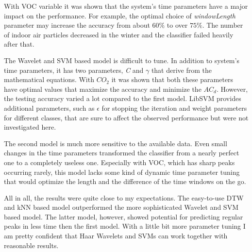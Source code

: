 With VOC variable it was shown that the system's time parameters have a major impact on the performance. For example, the optimal choice of \emph{windowLength} parameter may increase the accuracy from about $60 \%$ to over $75 \%$. The number of indoor air particles decreased in the winter and the classifier failed heavily after that.


The Wavelet and SVM based model is difficult to tune. In addition to system's time parameters, it has two parameters, \emph{C} and $\gamma$ that derive from the mathematical equations. With $CO_2$ it was shown that both these parameters have optimal values that maximize the accuracy and minimize the $AC_d$. However, the testing accuracy varied a lot compared to the first model. LibSVM provides additional parameters, such as $\epsilon$ for stopping the iteration and weight parameters for different classes, that are sure to affect the observed performance but were not investigated here.

The second model is much more sensitive to the available data. Even small changes in the time parameters transformed the classifier from a nearly perfect one to a completely useless one. Especially with VOC, which has sharp peaks occurring rarely, this model lacks some kind of dynamic time parameter tuning that would optimize the length and the difference of the time windows on the go.

All in all, the results were quite close to my expectations. The easy-to-use DTW and kNN based model outperformed the more sophisticated Wavelet and SVM based model. The latter model, however, showed potential for predicting regular peaks in less time then the first model. With a little bit more parameter tuning I am pretty confident that Haar Wavelets and SVMs can work together with reasonable results.



